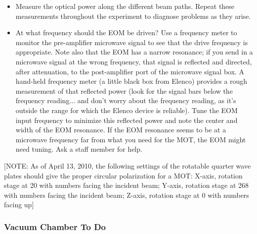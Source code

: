 \documentclass{../lab}
\begin{document}
\begin{itemize}
    \item Measure the optical power along the different beam paths. Repeat these measurements throughout the experiment to diagnose problems as they arise.

    \item At what frequency should the EOM be driven? Use a frequency meter to monitor the pre-amplifier microwave signal to see that the drive frequency is appropriate. Note also that the EOM has a narrow resonance; if you send in a microwave signal at the wrong frequency, that signal is reflected and directed, after attenuation, to the post-amplifier port of the microwave signal box. A hand-held frequency meter (a little black box from Elenco) provides a rough measurement of that reflected power (look for the signal bars below the frequency reading... and don't worry about the frequency reading, as it's outside the range for which the Elenco device is reliable). Tune the EOM input frequency to minimize this reflected power and note the center and width of the EOM resonance. If the EOM resonance seems to be at a microwave frequency far from what you need for the MOT, the EOM might need tuning. Ask a staff member for help.
\end{itemize}

[NOTE: As of April 13, 2010, the following settings of the rotatable quarter wave plates should give the proper circular polarization for a MOT: X-axis, rotation stage at 20 with numbers facing the incident beam; Y-axis, rotation stage at 268 with numbers facing the incident beam; Z-axis, rotation stage at 0 with numbers facing up]



\subsubsection{Vacuum Chamber To Do}
\end{document}
